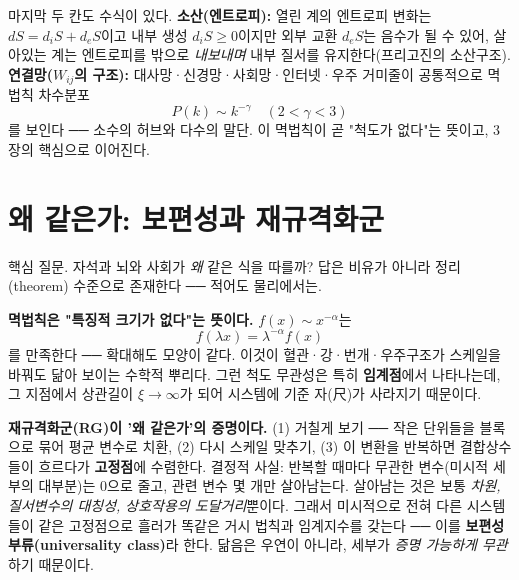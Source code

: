 \documentclass[11pt]{article}
\begin{document}
마지막 두 칸도 수식이 있다. \textbf{소산(엔트로피):} 열린 계의 엔트로피 변화는 $dS=d_iS+d_eS$이고 내부 생성 $d_iS\ge0$이지만 외부 교환 $d_eS$는 음수가 될 수 있어, 살아있는 계는 엔트로피를 밖으로 \emph{내보내며} 내부 질서를 유지한다(프리고진의 소산구조). \textbf{연결망($W_{ij}$의 구조):} 대사망·신경망·사회망·인터넷·우주 거미줄이 공통적으로 멱법칙 차수분포
\begin{equation}
P(k)\sim k^{-\gamma}\quad(2<\gamma<3)
\end{equation}
를 보인다 ── 소수의 허브와 다수의 말단. 이 멱법칙이 곧 "척도가 없다"는 뜻이고, 3장의 핵심으로 이어진다.

\section{왜 같은가: 보편성과 재규격화군}

핵심 질문. 자석과 뇌와 사회가 \emph{왜} 같은 식을 따를까? 답은 비유가 아니라 정리(theorem) 수준으로 존재한다 ── 적어도 물리에서는.

\textbf{멱법칙은 "특징적 크기가 없다"는 뜻이다.} $f(x)\sim x^{-\alpha}$는
\begin{equation}
f(\lambda x)=\lambda^{-\alpha} f(x)
\end{equation}
를 만족한다 ── 확대해도 모양이 같다. 이것이 혈관·강·번개·우주구조가 스케일을 바꿔도 닮아 보이는 수학적 뿌리다. 그런 척도 무관성은 특히 \textbf{임계점}에서 나타나는데, 그 지점에서 상관길이 $\xi\to\infty$가 되어 시스템에 기준 자(尺)가 사라지기 때문이다.

\textbf{재규격화군(RG)이 '왜 같은가'의 증명이다.} (1) 거칠게 보기 ── 작은 단위들을 블록으로 묶어 평균 변수로 치환, (2) 다시 스케일 맞추기, (3) 이 변환을 반복하면 결합상수들이 흐르다가 \textbf{고정점}에 수렴한다. 결정적 사실: 반복할 때마다 무관한 변수(미시적 세부의 대부분)는 0으로 줄고, 관련 변수 몇 개만 살아남는다. 살아남는 것은 보통 \emph{차원, 질서변수의 대칭성, 상호작용의 도달거리}뿐이다. 그래서 미시적으로 전혀 다른 시스템들이 같은 고정점으로 흘러가 똑같은 거시 법칙과 임계지수를 갖는다 ── 이를 \textbf{보편성 부류(universality class)}라 한다. 닮음은 우연이 아니라, 세부가 \emph{증명 가능하게 무관}하기 때문이다.
\end{document}
